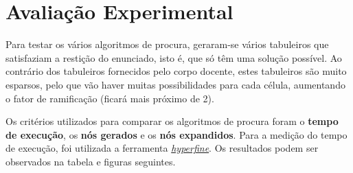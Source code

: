 \documentclass[12pt,a4paper]{article}
\begin{document}
\section{Avaliação Experimental}

Para testar os vários algoritmos de procura, geraram-se vários tabuleiros que satisfaziam a restição do enunciado, isto é,
que só têm uma solução possível. Ao contrário dos tabuleiros fornecidos pelo corpo docente, estes tabuleiros são muito
esparsos, pelo que vão haver muitas possibilidades para cada célula, aumentando o fator de ramificação
(ficará mais próximo de 2).

Os critérios utilizados para comparar os algoritmos de procura foram o \textbf{tempo de execução},
os \textbf{nós gerados} e os \textbf{nós expandidos}.
Para a medição do tempo de execução, foi utilizada a ferramenta \href{https://github.com/sharkdp/hyperfine}{\textit{hyperfine}}.
Os resultados podem ser observados na tabela e figuras seguintes.
\end{document}
